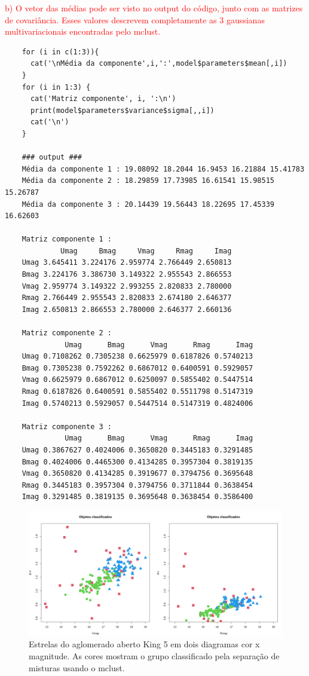 \textcolor{red}{b) O vetor das médias pode ser visto no output do código, junto com as matrizes de covariância. Esses valores descrevem completamente as 3 gaussianas multivariacionais encontradas pelo mclust.}

\begin{lstlisting}
    for (i in c(1:3)){
      cat('\nMédia da componente',i,':',model$parameters$mean[,i])
    }
    for (i in 1:3) {
      cat('Matriz componente', i, ':\n')
      print(model$parameters$variance$sigma[,,i])
      cat('\n')
    }
    
    ### output ###
    Média da componente 1 : 19.08092 18.2044 16.9453 16.21884 15.41783
    Média da componente 2 : 18.29859 17.73985 16.61541 15.98515 15.26787
    Média da componente 3 : 20.14439 19.56443 18.22695 17.45339 16.62603

    Matriz componente 1 :
             Umag     Bmag     Vmag     Rmag     Imag
    Umag 3.645411 3.224176 2.959774 2.766449 2.650813
    Bmag 3.224176 3.386730 3.149322 2.955543 2.866553
    Vmag 2.959774 3.149322 2.993255 2.820833 2.780000
    Rmag 2.766449 2.955543 2.820833 2.674180 2.646377
    Imag 2.650813 2.866553 2.780000 2.646377 2.660136
    
    Matriz componente 2 :
              Umag      Bmag      Vmag      Rmag      Imag
    Umag 0.7108262 0.7305238 0.6625979 0.6187826 0.5740213
    Bmag 0.7305238 0.7592262 0.6867012 0.6400591 0.5929057
    Vmag 0.6625979 0.6867012 0.6250097 0.5855402 0.5447514
    Rmag 0.6187826 0.6400591 0.5855402 0.5511798 0.5147319
    Imag 0.5740213 0.5929057 0.5447514 0.5147319 0.4824006
    
    Matriz componente 3 :
              Umag      Bmag      Vmag      Rmag      Imag
    Umag 0.3867627 0.4024006 0.3650820 0.3445183 0.3291485
    Bmag 0.4024006 0.4465300 0.4134285 0.3957304 0.3819135
    Vmag 0.3650820 0.4134285 0.3919677 0.3794756 0.3695648
    Rmag 0.3445183 0.3957304 0.3794756 0.3711844 0.3638454
    Imag 0.3291485 0.3819135 0.3695648 0.3638454 0.3586400
\end{lstlisting}

\vspace{2em}

\begin{figure}[h]
    \centering
    \includegraphics[width=0.8\linewidth]{Figuras/mistura.png}
    \caption{Estrelas do aglomerado aberto King 5 em dois diagramas cor x magnitude. As cores mostram o grupo classificado pela separação de misturas usando o mclust.}
    \label{misturas}
\end{figure}

